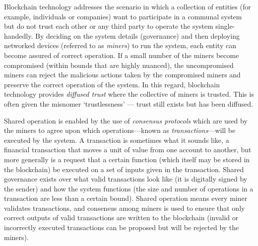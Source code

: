 
Blockchain technology addresses the scenario in which a collection of entities (for example, individuals or companies) want to participate in a communal system but do not trust each other or any third party to operate the system single-handedly. By deciding on the system details (governance) and then deploying networked devices (referred to as \emph{miners}) to run the system, each entity can become assured of correct operation. If a small number of the miners become compromised (within bounds that are highly nuanced), the uncompromised miners can reject the malicious actions taken by the compromised miners and preserve the correct operation of the system. In this regard, blockchain technology provides \emph{diffused trust} where the collective of miners is trusted. This is often given the misnomer `trustlessness' --- trust still exists but has been diffused.


Shared operation is enabled by the use of \emph{consensus protocols} which are used by the miners to agree upon which operations---known as \emph{transactions}---will be executed by the system. A transaction is sometimes what it sounds like, a financial transaction that moves a unit of value from one account to another, but more generally is a request that a certain function (which itself may be stored in the blockchain) be executed on a set of inputs given in the transaction. Shared governance exists over what valid transactions look like (\eg it is digitally signed by the sender) and how the system functions (\eg the size and number of operations in a transaction are less than a certain bound). Shared operation means every miner validates transactions, and consensus among miners is used to ensure that only correct outputs of valid transactions are written to the blockchain (invalid or incorrectly executed transactions can be proposed but will be rejected by the miners).

